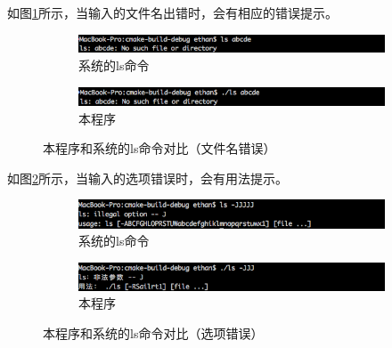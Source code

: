 \documentclass[UTF8,zihao=5,AutoFakeBold]{ctexart}
\begin{document}
如图\ref{fig:myls_and_ls_error}所示，当输入的文件名出错时，会有相应的错误提示。
\begin{figure}[h]
    \centering
    \begin{subfigure}[b]{0.7\linewidth}
        \includegraphics[width=\linewidth]{ls-error}
        \caption{系统的ls命令}
      \end{subfigure}
      \begin{subfigure}[b]{0.7\linewidth}
        \includegraphics[width=\linewidth]{myls-error}
        \caption{本程序}
      \end{subfigure}
    \caption{本程序和系统的ls命令对比（文件名错误）}
    \label{fig:myls_and_ls_error}
\end{figure}

如图\ref{fig:myls_and_ls_usage}所示，当输入的选项错误时，会有用法提示。
\begin{figure}[h]
    \centering
    \begin{subfigure}[b]{0.7\linewidth}
        \includegraphics[width=\linewidth]{ls-usage}
        \caption{系统的ls命令}
      \end{subfigure}
      \begin{subfigure}[b]{0.7\linewidth}
        \includegraphics[width=\linewidth]{myls-usage}
        \caption{本程序}
      \end{subfigure}
    \caption{本程序和系统的ls命令对比（选项错误）}
    \label{fig:myls_and_ls_usage}
\end{figure}
\end{document}
